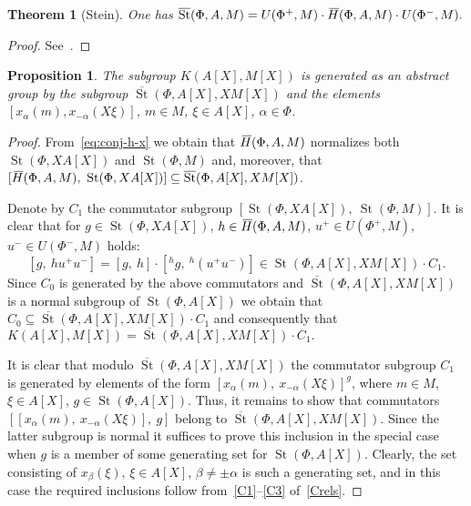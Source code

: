 \documentclass[oneside, 8pt]{amsart}
\newtheorem{prop}[lemma]{Proposition}
\newtheorem{externaltheorem}[lemma]{Theorem}
\theoremstyle{remark}
\theoremstyle{definition}
\numberwithin{lemma}{section}
\numberwithin{prop}{section}
\numberwithin{corollary}{section}
\numberwithin{externaltheorem}{section}
\DeclareMathOperator{\St}{St}
\newcommand{\myol}[2][3]{{}\mkern#1mu\overline{\mkern-#1mu#2}}
\numberwithin{equation}{section}
\begin{document}
\begin{externaltheorem}[Stein] \label{thm:Stein} One has $\overline{\St}(\Phi, A, M) = U(\Phi^+, M) \cdot \myol{H}(\Phi, A, M) \cdot U(\Phi^-, M).$ \end{externaltheorem} \begin{proof} See~\cite[Theorem~2.4]{Ste73}. \end{proof}

\begin{prop} \label{Kgen} The subgroup $K(A[X], M[X])$ is generated as an abstract group by the subgroup $\overline{\St}(\Phi, A[X], XM[X])$ and
 the elements $[x_\alpha(m), x_{-\alpha}(X\xi)]$, $m \in M$, $\xi \in A[X]$, $\alpha \in \Phi$. \end{prop}
\begin{proof} From~\eqref{eq:conj-h-x} we obtain that $\myol{H}(\Phi, A, M)$ normalizes both $\St(\Phi, XA[X])$ and $\St(\Phi, M)$ and, moreover, that $[\myol{H}(\Phi, A, M),\ \St(\Phi, XA[X])] \subseteq \overline{\St}(\Phi, A[X], XM[X])$. 

Denote by $C_1$ the commutator subgroup $[\St(\Phi, XA[X]),\ \St(\Phi, M)]$.
It is clear that for $g \in \St(\Phi, XA[X])$, $h \in \myol{H}(\Phi, A, M)$, $u^+ \in U(\Phi^+, M)$, $u^- \in U(\Phi^-, M)$ holds:
\[ [g,\ h u^+ u^-] = [g,\ h] \cdot [{}^{h}\!g,\ {}^{h}\!(u^+u^-)] \in \St(\Phi, A[X], XM[X]) \cdot C_1.\]
Since $C_0$ is generated by the above commutators and $\overline{\St}(\Phi, A[X], XM[X])$ is a normal subgroup of $\St(\Phi, A[X])$
we obtain that $C_0 \subseteq \overline{\St}(\Phi, A[X], XM[X]) \cdot C_1$ and consequently that
$K(A[X], M[X]) = \overline{\St}(\Phi, A[X], XM[X]) \cdot C_1.$
 
It is clear that modulo $\overline{\St}(\Phi, A[X], XM[X])$ the commutator subgroup $C_1$ is generated by elements of the form $[x_\alpha(m),\ x_{-\alpha}(X\xi)]^g$, where $m \in M$, $\xi \in A[X]$, $g \in \St(\Phi, A[X])$.
Thus, it remains to show that commutators $[[x_\alpha(m),\ x_{-\alpha}(X\xi)],\ g]$ belong to $\overline{\St}(\Phi, A[X], XM[X])$.
Since the latter subgroup is normal it suffices to prove this inclusion in the special case when $g$ is a member of some generating set for $\St(\Phi, A[X])$.
Clearly, the set consisting of $x_\beta(\xi)$, $\xi \in A[X]$, $\beta \neq \pm \alpha$ is such a generating set, 
 and in this case the required inclusions follow from~\eqref{C1}--\eqref{C3} of~\cref{Crels}. \end{proof}
\end{document}
